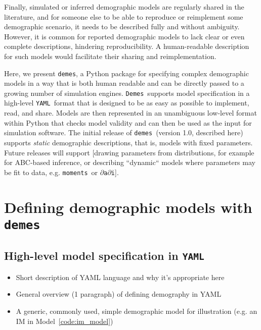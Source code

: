 \documentclass[11pt]{article}
\newenvironment{code}{\captionsetup{type=listing}\centering}{}
\newcommand{\demes}[0]{\texttt{demes}}
\newcommand{\Demes}[0]{\texttt{Demes}}
\newcommand{\YAML}[0]{\texttt{YAML}}
\newcommand{\moments}[0]{\texttt{moments}}
\newcommand{\dadi}[0]{\texttt{$\partial$a$\partial$i}}
\begin{document}
Finally, simulated or inferred demographic models are regularly shared in the
literature, and for someone else to be able to reproduce or reimplement some
demographic scenario, it needs to be described fully and without ambiguity. However,
it is common for reported demographic models to lack clear or even complete
descriptions, hindering reproducibility. A human-readable description for
such models would facilitate their sharing and reimplementation.

Here, we present \demes, a Python package for specifying complex demographic models
in a way that is both human readable and can be directly passed to a growing
number of simulation engines. \Demes\ supports model specification in a high-level
\YAML\ format \citep{ben2009yaml}
that is designed to be as easy as possible to implement, read, and
share. Models are then represented in an unambiguous low-level format within Python
that checks model validity and can then be used as the input for simulation software.
The initial release of \demes\ (version 1.0, described here) supports \emph{static}
demographic descriptions, that is, models with fixed parameters. Future releases
will support [drawing parameters from distributions, for example for ABC-based
inference, or describing ``dynamic`` models where parameters may be fit to data,
e.g. \moments\ or \dadi].

\section*{Defining demographic models with \demes}

\subsection*{High-level model specification in \YAML}

\begin{itemize}
\item Short description of YAML language and why it's appropriate here
\item General overview (1 paragraph) of defining demography in YAML
\item A generic, commonly used, simple demographic model for illustration (e.g.
  an IM in Model~\ref{code:im_model})
\end{itemize}

\begin{code}
\begin{tcolorbox}
\inputminted[linenos,numbersep=5pt]{yaml}{models/IM.yaml}
\end{tcolorbox}
\label{code:im_model}
\end{code}
\end{document}
